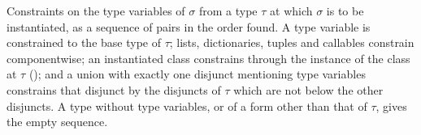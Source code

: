 Constraints on the type variables of $\sigma$ from a type $\tau$ at which $\sigma$ is to be instantiated, as a
sequence of pairs in the order found. A type variable is constrained to the base type of $\tau$; lists, dictionaries, tuples and
callables constrain componentwise; an instantiated class constrains through the instance of the class at $\tau$
(); and a union with exactly one disjunct mentioning type variables constrains that disjunct by
the disjuncts of $\tau$ which are not below the other disjuncts. A type without type variables, or of a form
other than that of $\tau$, gives the empty sequence.
